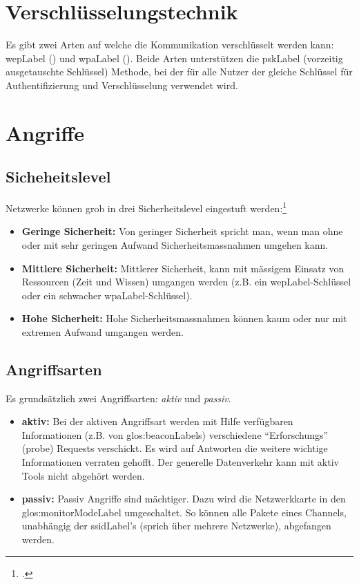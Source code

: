 \section{Verschlüsselungstechnik}
Es gibt zwei Arten auf welche die Kommunikation verschlüsselt werden kann: \gls{wepLabel} () und \gls{wpaLabel} ().
Beide Arten unterstützen die \gls{pskLabel} (vorzeitig ausgetauschte Schlüssel) Methode, bei der für alle Nutzer der gleiche Schlüssel für Authentifizierung und Verschlüsselung verwendet wird.

\section{Angriffe}

\subsection{Sicheheitslevel}
Netzwerke können grob in drei Sicherheitslevel eingestuft werden:\footcite[][115]{WrightCache201503}
\begin{itemize}
	\item \textbf{Geringe Sicherheit:} Von geringer Sicherheit spricht man, wenn man ohne oder mit sehr geringen Aufwand Sicherheitsmassnahmen umgehen kann.
	\item \textbf{Mittlere Sicherheit:} Mittlerer Sicherheit, kann mit mässigem Einsatz von Ressourcen (Zeit und Wissen) umgangen werden (z.B. ein \gls{wepLabel}-Schlüssel oder ein schwacher \gls{wpaLabel}-Schlüssel).
	\item \textbf{Hohe Sicherheit:} Hohe Sicherheitsmassnahmen können kaum oder nur mit extremen Aufwand umgangen werden.
\end{itemize}

\subsection{Angriffsarten}
Es grundsätzlich zwei Angriffsarten: \textit{aktiv} und \textit{passiv}.
\begin{itemize}
	\item \textbf{aktiv:}
	Bei der aktiven Angriffsart werden mit Hilfe verfügbaren Informationen (z.B. von \glspl{glos:beaconLabel}) verschiedene "`Erforschungs"' (probe) Requests verschickt.
	Es wird auf Antworten die weitere wichtige Informationen verraten gehofft.
	Der generelle Datenverkehr kann mit aktiv Tools nicht abgehört werden.

	\item \textbf{passiv:}
	Passiv Angriffe sind mächtiger. Dazu wird die Netzwerkkarte in den \gls{glos:monitorModeLabel} umgeschaltet.
	So können alle Pakete eines Channels, unabhängig der \gls{ssidLabel}'s (sprich über mehrere Netzwerke), abgefangen werden.

\end{itemize}

